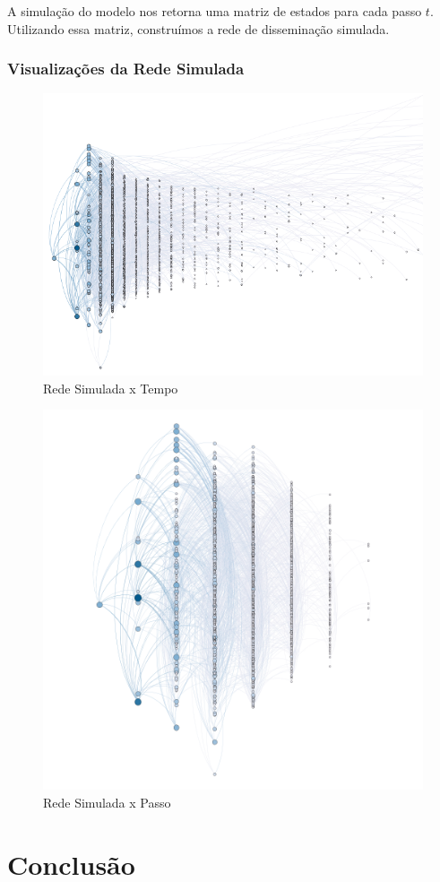 \documentclass[a4paper,12pt]{article}
\begin{document}
A simulação do modelo nos retorna uma matriz de estados para cada passo $t$. Utilizando essa matriz, construímos a rede de disseminação simulada.
\subsubsection{Visualizações da Rede Simulada}

\begin{figure}[ht]
 \centering
 \includegraphics[scale=0.8]{../results/simul.png}
 \caption{Rede Simulada x Tempo}
\end{figure}

\begin{figure}[h]
 \centering
 \includegraphics[scale=0.4]{../results/Untitled.png}
 \caption{Rede Simulada x Passo}
\end{figure}




\pagebreak
\section{Conclusão}






\end{document}
